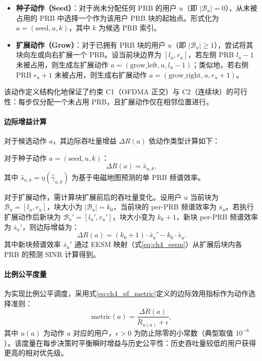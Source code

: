 \documentclass[type=master]{fduthesis}
\begin{document}
\begin{itemize}
\item \textbf{种子动作（Seed）}：对于尚未分配任何 PRB 的用户 $u$（即 $|\mathcal{B}_u| = 0$），从未被占用的 PRB 中选择一个作为该用户 PRB 块的起始点。形式化为 $a = (\text{seed}, u, k)$，其中 $k$ 为候选 PRB 索引。

\item \textbf{扩展动作（Grow）}：对于已拥有 PRB 块的用户 $u$（即 $|\mathcal{B}_u| \geq 1$），尝试将其块向左或向右扩展一个 PRB。设当前块边界为 $[l_u, r_u]$，若左侧 PRB $l_u - 1$ 未被占用，则生成左扩展动作 $a = (\text{grow\_left}, u, l_u - 1)$；类似地，若右侧 PRB $r_u + 1$ 未被占用，则生成右扩展动作 $a = (\text{grow\_right}, u, r_u + 1)$。
\end{itemize}

该动作定义结构化地保证了约束 C1（OFDMA 正交）与 C2（连续块）的可行性：每步仅分配一个未占用 PRB，且扩展动作仅在相邻位置进行。

\paragraph{边际增益计算}
对于候选动作 $a$，其边际吞吐量增益 $\Delta R(a)$ 依动作类型计算如下：

对于种子动作 $a = (\text{seed}, u, k)$：
\begin{equation}
\Delta R(a) = \hat{s}_{u,k},
\label{eq:ch4_delta_seed}
\end{equation}
其中 $\hat{s}_{u,k} = \eta(\hat{\gamma}_{u,k})$ 为基于电磁地图预测的单 PRB 频谱效率。

对于扩展动作，需计算块扩展前后的吞吐量变化。设用户 $u$ 当前块为 $\mathcal{B}_u = [l_u, r_u]$，块大小为 $|\mathcal{B}_u| = k_0$，当前块的 per-PRB 频谱效率为 $\bar{s}_u$。若执行扩展动作后新块为 $\mathcal{B}_u' = [l_u', r_u']$，块大小变为 $k_0 + 1$，新块 per-PRB 频谱效率为 $\bar{s}_u'$，则边际增益为：
\begin{equation}
\Delta R(a) = (k_0 + 1) \cdot \bar{s}_u' - k_0 \cdot \bar{s}_u.
\label{eq:ch4_delta_grow}
\end{equation}
其中新块频谱效率 $\bar{s}_u'$ 通过 EESM 映射（式\eqref{eq:ch4_eesm}）从扩展后块内各 PRB 的预测 SINR 计算得到。

\paragraph{比例公平度量}
为实现比例公平调度，采用式\eqref{eq:ch4_pf_metric}定义的边际效用指标作为动作选择准则：
\begin{equation}
\text{metric}(a) = \frac{\Delta R(a)}{\bar{R}_{u(a)} + \epsilon},
\label{eq:ch4_greedy_metric}
\end{equation}
其中 $u(a)$ 为动作 $a$ 对应的用户，$\epsilon > 0$ 为防止除零的小常数（典型取值 $10^{-6}$）。该度量在每步决策时平衡瞬时增益与历史公平性：历史吞吐量较低的用户获得更高的相对优先级。
\end{document}
